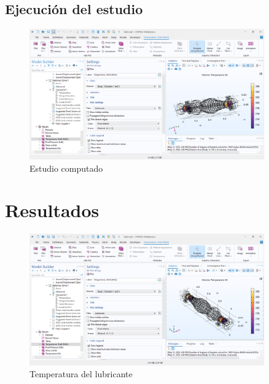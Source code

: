 \documentclass{article}
\theoremstyle{mytheoremstyle}
\theoremstyle{mytheoremstyle}
\theoremstyle{myproblemstyle}
\begin{document}
    \subsection{Ejecución del estudio}
             \begin{figure}[H]
              \centering
              \includegraphics[width=0.9\textwidth]{comp1.png}
              \caption{Estudio computado}
              \label{fig:comsol_estudio_computado_img} %
            \end{figure}

            \section{Resultados}
             \begin{figure}[H]
              \centering
              \includegraphics[width=0.9\textwidth]{temp_lubricant.png}
              \caption{Temperatura del lubricante}
              \label{fig:comsol_temp_lubricante}
            \end{figure}
\end{document}
